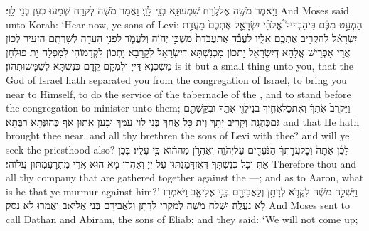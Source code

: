 {וַיֹּ֥אמֶר מֹשֶׁ֖ה אֶל\maqqaf קֹ֑רַח שִׁמְעוּ\maqqaf נָ֖א בְּנֵ֥י לֵוִֽי׃}
{וַאֲמַר מֹשֶׁה לְקֹרַח שְׁמַעוּ כְעַן בְּנֵי לֵוִי׃}
{And Moses said unto Korah: ‘Hear now, ye sons of Levi:}{}
{הַמְעַ֣ט מִכֶּ֗ם כִּֽי\maqqaf הִבְדִּיל֩ אֱלֹהֵ֨י יִשְׂרָאֵ֤ל אֶתְכֶם֙ מֵעֲדַ֣ת יִשְׂרָאֵ֔ל לְהַקְרִ֥יב אֶתְכֶ֖ם אֵלָ֑יו לַעֲבֹ֗ד אֶת\maqqaf עֲבֹדַת֙ מִשְׁכַּ֣ן יְהֹוָ֔ה וְלַעֲמֹ֛ד לִפְנֵ֥י הָעֵדָ֖ה לְשָׁרְתָֽם׃}
{הַזְעֵיר לְכוֹן אֲרֵי אַפְרֵישׁ אֱלָהָא דְּיִשְׂרָאֵל יָתְכוֹן מִכְּנִשְׁתָּא דְּיִשְׂרָאֵל לְקָרָבָא יָתְכוֹן לִקְדָמוֹהִי לְמִפְלַח יָת פּוּלְחַן מַשְׁכְּנָא דַּייָ וְלִמְקָם קֳדָם כְּנִשְׁתָּא לְשַׁמָּשׁוּתְהוֹן׃}
{is it but a small thing unto you, that the God of Israel hath separated you from the congregation of Israel, to bring you near to Himself, to do the service of the tabernacle of the \lord, and to stand before the congregation to minister unto them;}{}
{וַיַּקְרֵב֙ אֹֽתְךָ֔ וְאֶת\maqqaf כׇּל\maqqaf אַחֶ֥יךָ בְנֵי\maqqaf לֵוִ֖י אִתָּ֑ךְ וּבִקַּשְׁתֶּ֖ם גַּם\maqqaf כְּהֻנָּֽה׃}
{וְקָרֵיב יָתָךְ וְיָת כָּל אֲחָךְ בְּנֵי לֵוִי עִמָּךְ וּבָעַן אַתּוּן אַף כְּהוּנְּתָא רַבְּתָא׃}
{and that He hath brought thee near, and all thy brethren the sons of Levi with thee? and will ye seek the priesthood also?}{}
{לָכֵ֗ן אַתָּה֙ וְכׇל\maqqaf עֲדָ֣תְךָ֔ הַנֹּעָדִ֖ים עַל\maqqaf יְהֹוָ֑ה וְאַהֲרֹ֣ן מַה\maqqaf ה֔וּא כִּ֥י  עָלָֽיו׃}
{בְּכֵן אַתְּ וְכָל כְּנִשְׁתָּךְ דְּאִזְדָּמַנְתּוּן עַל יְיָ וְאַהֲרֹן מָא הוּא אֲרֵי מִתְרָעֲמִתּוּן עֲלוֹהִי׃}
{Therefore thou and all thy company that are gathered together against the \lord—; and as to Aaron, what is he that ye murmur against him?’}{}
{וַיִּשְׁלַ֣ח מֹשֶׁ֔ה לִקְרֹ֛א לְדָתָ֥ן וְלַאֲבִירָ֖ם בְּנֵ֣י אֱלִיאָ֑ב וַיֹּאמְר֖וּ לֹ֥א נַעֲלֶֽה׃}
{וּשְׁלַח מֹשֶׁה לְמִקְרֵי לְדָתָן וְלַאֲבִירָם בְּנֵי אֱלִיאָב וַאֲמַרוּ לָא נִסַּק׃}
{And Moses sent to call Dathan and Abiram, the sons of Eliab; and they said: ‘We will not come up;}{}

